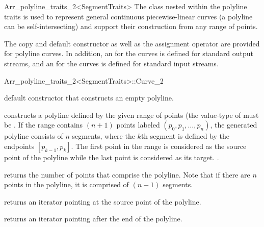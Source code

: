 \begin{ccRefClass}{Arr_polyline_traits_2<SegmentTraits>}
The  class nested within the polyline traits is used to
represent general continuous piecewise-linear curves (a polyline can be
self-intersecting) and support their construction from any range of points.

The copy and default constructor as well as 
the assignment operator are provided for polyline curves. In addition, 
an  for the curves is defined for standard output streams,
and an  for the curves is defined for standard input streams.

\begin{ccClass}{Arr_polyline_traits_2<SegmentTraits>::Curve_2}

\ccTypes



\ccCreation
{}

  {default constructor that constructs an empty polyline.}

  {constructs a polyline defined by the given range of points
   \ccc{[first, last)} (the value-type of  must be
   .
   If the range contains $(n + 1)$ points labeled $(p_{0},p_{1},\ldots,p_{n})$,
   the generated polyline consists of $n$ segments, where the $k$th segment 
   is defined by the endpoints $[p_{k-1},p_{k}]$. The first point in the 
   range is considered as the source point of the polyline while the last 
   point is considered as its target.
   .}

\ccAccessFunctions

  {returns the number of points that comprise the polyline.
   Note that if there are $n$ points in the polyline, it is comprised
   of $(n - 1)$ segments.}

  {returns an iterator pointing at the source point of the polyline.}

  {returns an iterator pointing after the end of the polyline.}


\end{ccClass}
\end{ccRefClass}

